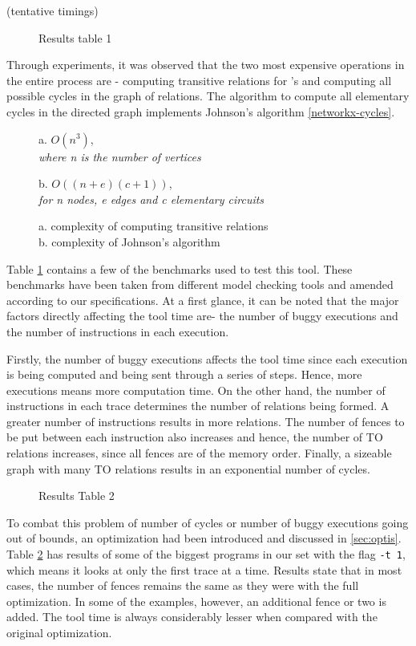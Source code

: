 (tentative timings)
\begin{figure}
	
	\caption{Results table 1}\label{fig:tabl1}
\end{figure}

Through experiments, it was observed that the two most expensive operations
in the entire process are - computing transitive relations for \setHB's and
computing all possible cycles in the graph of \setSC relations. The algorithm 
to compute all elementary cycles in the directed graph implements
Johnson's algorithm \ref{networkx-cycles}.

\begin{figure}
	a. $O(n^3)$, \\
	\textit{where n is the number of vertices}
	
	
	b. $O((n+e)(c+1))$, \\
	\textit{for n nodes, e edges and c elementary circuits}
	\caption{a. complexity of computing transitive \setHB relations\\
	b. complexity of Johnson's algorithm}
\end{figure}

Table \ref{fig:tabl1} contains a few of the benchmarks used to test this tool.
These benchmarks have been taken from different model checking tools and amended
according to our specifications. At a first glance, it can be noted that
the major factors directly affecting the tool time are- the number of buggy executions
and the number of instructions in each execution.

Firstly, the number of buggy executions affects the tool time since each execution
is being computed and being sent through a series of steps. Hence, more executions means more
computation time. On the other hand, the number of instructions in each trace 
determines the number of relations being formed. A greater number of instructions
results in more \setHB relations. The number of fences to be put between each instruction also
increases and hence, the number of TO relations increases, since all fences are of the
\mosc memory order. Finally, a sizeable graph with many TO relations
results in an exponential number of cycles. 

\begin{figure}
	
	\caption{Results Table 2}\label{fig:tabl2}
\end{figure}

To combat this problem of number of cycles or number of buggy executions going out of bounds,
an optimization had been introduced and discussed in \ref{sec:optis}. Table \ref{fig:tabl2}
has results of some of the biggest programs in our set with the flag \texttt{-t 1},
which means it looks at only the first trace at a time. Results state that
in most cases, the number of fences remains the same as they were with the 
full optimization. In some of the examples, however, an additional fence or two
is added. The tool time is always considerably lesser when compared with
the original optimization.
